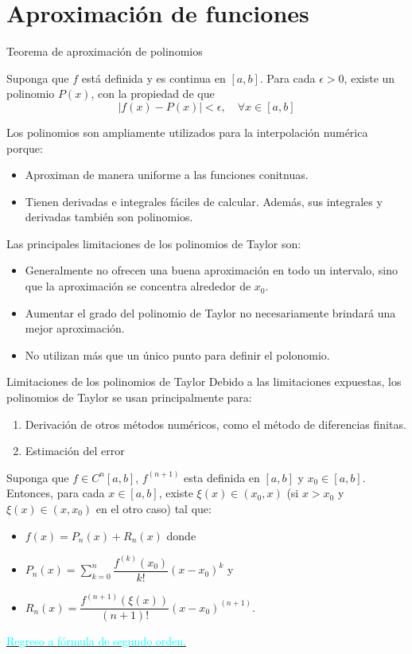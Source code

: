 \section{Aproximación de funciones}
\begin{frame}{Teorema de aproximación de polinomios}
\begin{Teo}[Weierestrass]
Suponga que $f$ está definida y es continua en $[a, b]$. Para cada $\epsilon>0$, existe un polinomio $P(x)$, con la propiedad de que 
$$|f(x)-P(x)|<\epsilon, \quad \forall x \in [a, b]$$
\end{Teo}
\indent Los polinomios son ampliamente utilizados para la interpolación numérica porque:
\begin{itemize}
\item Aproximan de manera uniforme a las funciones conitnuas. 
\item Tienen derivadas e integrales fáciles de calcular. Además, sus integrales y derivadas también son polinomios. 
\end{itemize}
\indent Las principales limitaciones de los polinomios de Taylor son:
\begin{itemize}
\item Generalmente no ofrecen una buena aproximación en todo un intervalo, sino que la aproximación se concentra alrededor de $x_0$.
\item Aumentar el grado del polinomio de Taylor no necesariamente brindará una mejor aproximación.   
\item No utilizan más que un único punto para definir el polonomio.  
\end{itemize}
\end{frame}
\begin{frame}{Limitaciones de los polinomios de Taylor}
\indent Debido a las limitaciones expuestas, los polinomios de Taylor se usan principalmente para:
\begin{enumerate}
\item Derivación de otros métodos numéricos, como el método de diferencias finitas.
\item Estimación del error
\end{enumerate}
\label{TeoremaTaylor}
\begin{Teo}
Suponga que $f\in C^n[a,b]$, $f^{(n+1)}$ esta definida en $[a,b]$ y $x_0\in[a,b]$. Entonces, para cada $x\in[a,b]$, existe $\xi(x)\in (x_0,x)$ (si $x>x_0$ y $\xi(x)\in(x,x_0)$ en el otro caso)  tal que: 
\begin{itemize}
\item $f(x)=P_n(x)+R_n(x)$ donde
\item $P_n(x)=\displaystyle \sum_{k=0}^{n}\dfrac{f^{(k)}(x_0)}{k!}(x-x_0)^k$ y
\item $R_n(x)=\dfrac{f^{(n+1)}(\xi(x))}{(n+1)!}(x-x_0)^{(n+1)}$.
\end{itemize}
\hyperlink{DeduccionFormulaSegundoOrden}{\textcolor{cyan}{Regreso a fórmula de segundo orden.}}
\end{Teo}
\end{frame}
